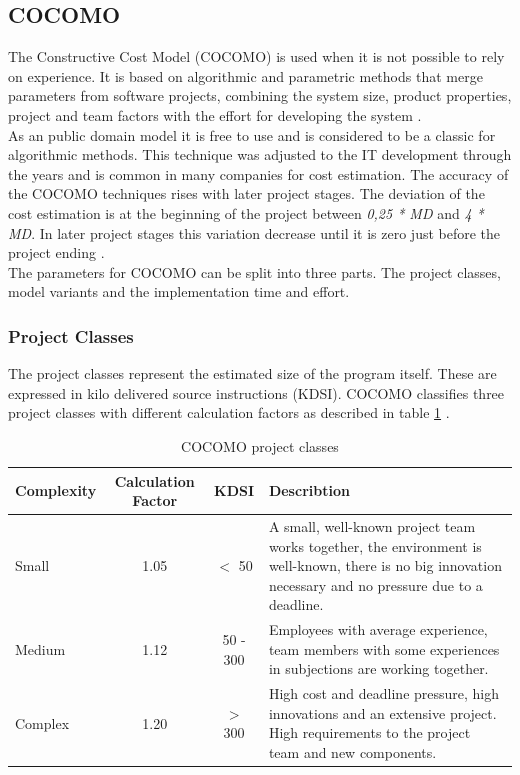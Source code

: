 \subsection{COCOMO} \label{COCOMOMethod}

The Constructive Cost Model (COCOMO) is used when it is not possible to rely on experience. It is based on algorithmic and parametric methods that merge parameters from software projects, combining the system size, product properties, project and team factors with the effort for developing the system \cite{jenny}.\\
As an public domain model it is free to use and is considered to be a classic for algorithmic methods. This technique was adjusted to the IT development through the years and is common in many companies for cost estimation.
The accuracy of the COCOMO techniques rises with later project stages. The deviation of the cost estimation is at the beginning of the project between \textit{0,25 * MD} and \textit{4 * MD}. In later project stages this variation decrease until it is zero just before the project ending \cite{sommerville}.\\
The parameters for COCOMO can be split into three parts. The project classes, model variants and the implementation time and effort.

\subsubsection{Project Classes}

The project classes represent the estimated size of the program itself. These are expressed in kilo delivered source instructions (KDSI). COCOMO classifies three project classes with different calculation factors as described in table \ref{tab:projectclasses} \cite{sommerville}.

\begin{table}[h]
	\centering 
	\setlength{\tabcolsep}{4pt}
	\begin{tabular}{|l|c|c|p{6cm}|}\hline
		Complexity	& Calculation Factor& KDSI 	& Describtion\\ \hline
		Small   	& 1.05        		& $<$ 50  			& A small, well-known project team works together, the environment is well-known, there is no big innovation necessary and no pressure due to a deadline.\\ \hline
		Medium 		& 1.12        		& 50 - 300 			& Employees with average experience, team members with some experiences in subjections are working together.  \\ \hline
		Complex 	& 1.20 				& $>$ 300 			& High cost and deadline pressure, high innovations and an extensive project. High requirements to the project team and new components.  \\ \hline
	\end{tabular} 
	\caption{COCOMO project classes} 
	\label{tab:projectclasses} 
\end{table}

